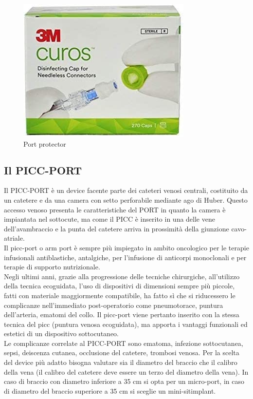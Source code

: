 \begin{figure}[H]
    \begin{center}
    \includegraphics[width=0.5\columnwidth]{img/portprotectors.jpg}
    \end{center}
    \caption[Port protector]{Port protector
    \cite{img47}}

\end{figure}

\subsection{Il PICC-PORT}

Il PICC-PORT è un device facente parte dei cateteri venosi centrali, costituito da un catetere e da una camera con 
setto perforabile mediante ago di Huber. Questo accesso venoso presenta le caratteristiche del PORT in quanto la 
camera è impiantata nel sottocute, ma come il PICC è inserito in una delle vene dell’avambraccio e la punta del 
catetere arriva in prossimità della giunzione cavo-atriale\cite{CRO}.\\
Il picc-port o arm port è sempre più impiegato in ambito oncologico per le terapie infusionali antiblastiche, 
antalgiche, per l’infusione di anticorpi monoclonali e per terapie di supporto nutrizionale\cite{GAVECELTPICCPORT}.\\
Negli ultimi anni, grazie alla progressione delle tecniche chirurgiche, all’utilizzo della tecnica ecoguidata, 
l’uso di dispositivi di dimensioni sempre più piccole, fatti con materiale maggiormente compatibile, ha fatto sì che 
si riducessero le complicanze nell’immediato post-operatorio come pneumotorace, puntura dell’arteria, 
ematomi del collo. Il picc-port viene pertanto inserito con la stessa tecnica del picc (puntura venosa ecoguidata), 
ma apporta i vantaggi funzionali ed estetici di un dispositivo sottocutaneo\cite{MERLICCO}.\\
Le complicanze correlate al PICC-PORT sono ematoma, infezione sottocutanea, sepsi, deiscenza cutanea, occlusione del 
catetere, trombosi venosa. 
Per la scelta del device più adatto bisogna valutare sia il diametro del braccio che il calibro della vena 
(il calibro del catetere deve essere un terzo del diametro della vena). In caso di braccio con diametro inferiore a 
35 cm si opta per un micro-port, in caso di diametro del braccio superiore a 35 cm si sceglie un 
mini-sitimplant\cite{GAVECELTPICCPORT}.\\

